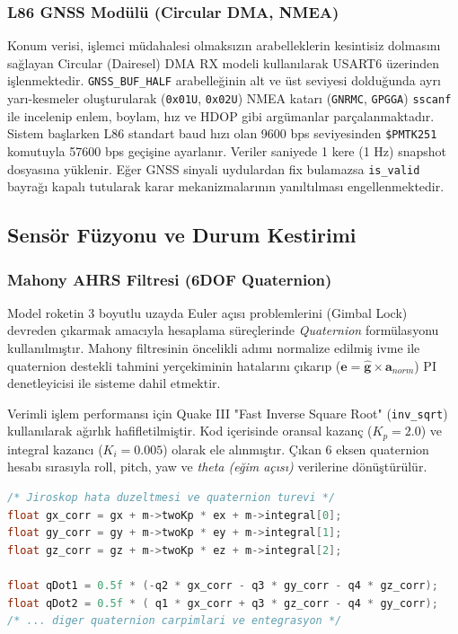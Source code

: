 \subsubsection{L86 GNSS Modülü (Circular DMA, NMEA)}
Konum verisi, işlemci müdahalesi olmaksızın arabelleklerin kesintisiz dolmasını sağlayan Circular (Dairesel) DMA RX modeli kullanılarak USART6 üzerinden işlenmektedir. \verb|GNSS_BUF_HALF| arabelleğinin alt ve üst seviyesi dolduğunda ayrı yarı-kesmeler oluşturularak (\verb|0x01U|, \verb|0x02U|) NMEA katarı (\verb|GNRMC|, \verb|GPGGA|) \verb|sscanf| ile incelenip enlem, boylam, hız ve HDOP gibi argümanlar parçalanmaktadır.
Sistem başlarken L86 standart baud hızı olan 9600 bps seviyesinden \verb|$PMTK251| komutuyla 57600 bps geçişine ayarlanır. Veriler saniyede 1 kere (1 Hz) snapshot dosyasına yüklenir. Eğer GNSS sinyali uydulardan fix bulamazsa \verb|is_valid| bayrağı kapalı tutularak karar mekanizmalarının yanıltılması engellenmektedir.

\subsection{Sensör Füzyonu ve Durum Kestirimi}
\label{sensor_fuzyonu_ve_durum_kestirimi}

\subsubsection{Mahony AHRS Filtresi (6DOF Quaternion)}
Model roketin 3 boyutlu uzayda Euler açısı problemlerini (Gimbal Lock) devreden çıkarmak amacıyla hesaplama süreçlerinde \textit{Quaternion} formülasyonu kullanılmıştır. Mahony filtresinin öncelikli adımı normalize edilmiş ivme ile quaternion destekli tahmini yerçekiminin hatalarını çıkarıp ($\mathbf{e} = \hat{\mathbf{g}} \times \mathbf{a}_{norm}$) PI denetleyicisi ile sisteme dahil etmektir. 

Verimli işlem performansı için Quake III "Fast Inverse Square Root" (\verb|inv_sqrt|) kullanılarak ağırlık hafifletilmiştir. Kod içerisinde oransal kazanç ($K_p=2.0$) ve integral kazancı ($K_i=0.005$) olarak ele alınmıştır. Çıkan 6 eksen quaternion hesabı sırasıyla roll, pitch, yaw ve \textit{theta (eğim açısı)} verilerine dönüştürülür.

\begin{lstlisting}[language=C, caption={Mahony Quaternion Türevi Güncellemesi (\texttt{mahony.c})}]
/* Jiroskop hata duzeltmesi ve quaternion turevi */
float gx_corr = gx + m->twoKp * ex + m->integral[0];
float gy_corr = gy + m->twoKp * ey + m->integral[1];
float gz_corr = gz + m->twoKp * ez + m->integral[2];

float qDot1 = 0.5f * (-q2 * gx_corr - q3 * gy_corr - q4 * gz_corr);
float qDot2 = 0.5f * ( q1 * gx_corr + q3 * gz_corr - q4 * gy_corr);
/* ... diger quaternion carpimlari ve entegrasyon */
\end{lstlisting}

